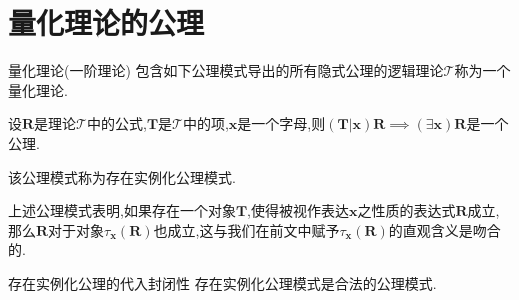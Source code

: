 \section{量化理论的公理}

\begin{definition}{量化理论(一阶理论)}{}
	包含如下公理模式导出的所有隐式公理的逻辑理论$\mathcal{T}$称为一个量化理论.
	\begin{center}
		设$\boldsymbol{R}$是理论$\mathcal{T}$中的公式,$\boldsymbol{T}$是$\mathcal{T}$中的项,$\boldsymbol{x}$是一个字母,则$\left(\boldsymbol{T}|\boldsymbol{x}\right)\boldsymbol{R}\implies\left(\exists\boldsymbol{x}\right)\boldsymbol{R}$是一个公理.
	\end{center}
	该公理模式称为存在实例化公理模式.
\end{definition}

\begin{remark}{}{}
	上述公理模式表明,如果存在一个对象$\boldsymbol{T}$,使得被视作表达$\boldsymbol{x}$之性质的表达式$\boldsymbol{R}$成立,那么$\boldsymbol{R}$对于对象$\tau_{\boldsymbol{x}}\left(\boldsymbol{R}\right)$也成立,这与我们在前文中赋予$\tau_{\boldsymbol{x}}\left(\boldsymbol{R}\right)$的直观含义是吻合的.
\end{remark}

\begin{theorem}{存在实例化公理的代入封闭性}{}
	存在实例化公理模式是合法的公理模式.
\end{theorem}
